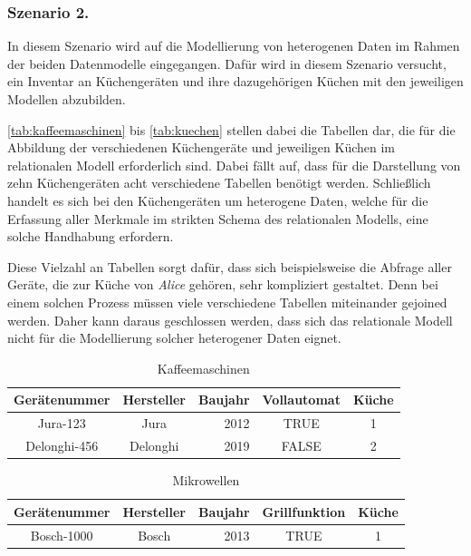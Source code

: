 \subsubsection{Szenario 2.}
In diesem Szenario wird auf die Modellierung von heterogenen Daten im Rahmen der beiden Datenmodelle eingegangen. Dafür wird in diesem Szenario versucht, ein Inventar an Küchengeräten und ihre dazugehörigen Küchen mit den jeweiligen Modellen abzubilden. 

\autoref{tab:kaffeemaschinen} bis \autoref{tab:kuechen} stellen dabei die Tabellen dar, die für die Abbildung der verschiedenen Küchengeräte und jeweiligen Küchen im relationalen Modell erforderlich sind. Dabei fällt auf, dass für die Darstellung von zehn Küchengeräten acht verschiedene Tabellen benötigt werden. Schließlich handelt es sich bei den Küchengeräten um heterogene Daten, welche für die Erfassung aller Merkmale im strikten Schema des relationalen Modells, eine solche Handhabung erfordern. 

Diese Vielzahl an Tabellen sorgt dafür, dass sich beispielsweise die Abfrage aller Geräte, die zur Küche von \textit{Alice} gehören, sehr kompliziert gestaltet. Denn bei einem solchen Prozess müssen viele verschiedene Tabellen miteinander gejoined werden. Daher kann daraus geschlossen werden, dass sich das relationale Modell nicht für die Modellierung solcher heterogener Daten eignet.

\begin{table}[!ht]
    \centering
    \begin{tabular}{c|c|r|c|c}
    \hline
    \rowcolor[HTML]{EFEFEF} 
    \textbf{Gerätenummer} & \textbf{Hersteller} & \multicolumn{1}{c|}{\cellcolor[HTML]{EFEFEF}\textbf{Baujahr}} & \textbf{Vollautomat} & \textbf{Küche} \\ \hline
    Jura-123 & Jura & 2012 & TRUE & 1 \\
    Delonghi-456 & Delonghi & 2019 & FALSE & 2 \\ \hline
    \end{tabular}
    \caption{Kaffeemaschinen}
    \label{tab:kaffeemaschinen}
\end{table}

\begin{table}[!ht]
    \centering
    \begin{tabular}{c|c|c|c|c}
    \hline
    \rowcolor[HTML]{EFEFEF} 
    \textbf{Gerätenummer} & \textbf{Hersteller} & \textbf{Baujahr} & \textbf{Grillfunktion} & \textbf{Küche} \\ \hline
    Bosch-1000 & Bosch & \multicolumn{1}{r|}{2013} & TRUE & 1 \\ \hline
    \end{tabular}
    \caption{Mikrowellen}
    \label{tab:mikrowellen}
\end{table}

